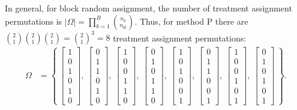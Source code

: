 \documentclass[11pt]{article}\usepackage[]{graphicx}\usepackage[]{color}
\theoremstyle{newstyle}
\begin{document}
In general, for block random assignment, the number of treatment assignment permutations is $\left| \Omega \right| = \prod \limits_{b = 1}^B {n_b \choose n_{bt}}$. Thus, for method P there are ${2 \choose 1}{2 \choose 1}{2 \choose 1} = {2 \choose 1}^3 = 8$ treatment assignment permutations:
\begin{align*}
\Omega & = \left\{ \ \begin{bmatrix} 1 \\ 0 \\ 1 \\ 0 \\ 1 \\ 0 \end{bmatrix}, \  \begin{bmatrix} 0 \\ 1 \\ 1 \\ 0 \\ 1 \\ 0 \end{bmatrix}, \ \begin{bmatrix} 1 \\ 0 \\ 0 \\ 1 \\ 1 \\ 0 \end{bmatrix}, \ \begin{bmatrix} 0 \\ 1 \\ 0 \\ 1 \\ 1 \\ 0 \end{bmatrix}, \ \begin{bmatrix} 1 \\ 0 \\ 1 \\ 0 \\ 0 \\ 1 \end{bmatrix}, \ \begin{bmatrix} 0 \\ 1 \\ 1 \\ 0 \\ 0 \\ 1 \end{bmatrix}, \ \begin{bmatrix} 1 \\ 0 \\ 0 \\ 1 \\ 0 \\ 1 \end{bmatrix}, \ \begin{bmatrix} 0 \\ 1 \\ 0 \\ 1 \\ 0 \\ 1 \end{bmatrix} \ \right\}.
\end{align*}
\end{document}
